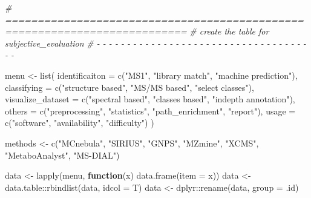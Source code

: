 \documentclass[
]{article}
\newenvironment{Shaded}{\begin{snugshade}}{\end{snugshade}}
\newcommand{\AttributeTok}[1]{\textcolor[rgb]{0.77,0.63,0.00}{#1}}
\newcommand{\CommentTok}[1]{\textcolor[rgb]{0.56,0.35,0.01}{\textit{#1}}}
\newcommand{\ControlFlowTok}[1]{\textcolor[rgb]{0.13,0.29,0.53}{\textbf{#1}}}
\newcommand{\FunctionTok}[1]{\textcolor[rgb]{0.00,0.00,0.00}{#1}}
\newcommand{\NormalTok}[1]{#1}
\newcommand{\OtherTok}[1]{\textcolor[rgb]{0.56,0.35,0.01}{#1}}
\newcommand{\SpecialCharTok}[1]{\textcolor[rgb]{0.00,0.00,0.00}{#1}}
\newcommand{\StringTok}[1]{\textcolor[rgb]{0.31,0.60,0.02}{#1}}
\begin{document}
\begin{Shaded}
\begin{Highlighting}[]
\CommentTok{\# ==========================================================================}
\CommentTok{\# create the table for subjective\_evaluation}
\CommentTok{\# {-} {-} {-} {-} {-} {-} {-} {-} {-} {-} {-} {-} {-} {-} {-} {-} {-} {-} {-} {-} {-} {-} {-} {-} {-} {-} {-} {-} {-} {-} {-} {-} {-} {-} {-} {-} {-}}

\NormalTok{menu }\OtherTok{\textless{}{-}} \FunctionTok{list}\NormalTok{(}
  \AttributeTok{identificaiton =} \FunctionTok{c}\NormalTok{(}\StringTok{"MS1"}\NormalTok{, }\StringTok{"library match"}\NormalTok{, }\StringTok{"machine prediction"}\NormalTok{),}
  \AttributeTok{classifying =} \FunctionTok{c}\NormalTok{(}\StringTok{"structure based"}\NormalTok{, }\StringTok{"MS/MS based"}\NormalTok{, }\StringTok{"select classes"}\NormalTok{),}
  \AttributeTok{visualize\_dataset =} \FunctionTok{c}\NormalTok{(}\StringTok{"spectral based"}\NormalTok{, }\StringTok{"classes based"}\NormalTok{, }\StringTok{"indepth annotation"}\NormalTok{),}
  \AttributeTok{others =} \FunctionTok{c}\NormalTok{(}\StringTok{"preprocessing"}\NormalTok{, }\StringTok{"statistics"}\NormalTok{, }\StringTok{"path\_enrichment"}\NormalTok{, }\StringTok{"report"}\NormalTok{),}
  \AttributeTok{usage =} \FunctionTok{c}\NormalTok{(}\StringTok{"software"}\NormalTok{, }\StringTok{"availability"}\NormalTok{, }\StringTok{"difficulty"}\NormalTok{)}
\NormalTok{)}

\NormalTok{methods }\OtherTok{\textless{}{-}} \FunctionTok{c}\NormalTok{(}\StringTok{"MCnebula"}\NormalTok{, }\StringTok{"SIRIUS"}\NormalTok{, }\StringTok{"GNPS"}\NormalTok{, }\StringTok{"MZmine"}\NormalTok{, }\StringTok{"XCMS"}\NormalTok{, }\StringTok{"MetaboAnalyst"}\NormalTok{, }\StringTok{"MS{-}DIAL"}\NormalTok{)}

\NormalTok{data }\OtherTok{\textless{}{-}} \FunctionTok{lapply}\NormalTok{(menu, }\ControlFlowTok{function}\NormalTok{(x) }\FunctionTok{data.frame}\NormalTok{(}\AttributeTok{item =}\NormalTok{ x))}
\NormalTok{data }\OtherTok{\textless{}{-}}\NormalTok{ data.table}\SpecialCharTok{::}\FunctionTok{rbindlist}\NormalTok{(data, }\AttributeTok{idcol =}\NormalTok{ T)}
\NormalTok{data }\OtherTok{\textless{}{-}}\NormalTok{ dplyr}\SpecialCharTok{::}\FunctionTok{rename}\NormalTok{(data, }\AttributeTok{group =}\NormalTok{ .id)}


\end{Highlighting}
\end{Shaded}
\end{document}
